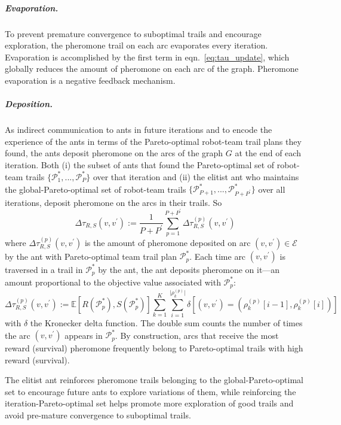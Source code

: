 \documentclass[11pt, oneside]{article}
\begin{document}
\subparagraph{Evaporation.} To prevent premature convergence to suboptimal trails and encourage exploration, the pheromone trail on each arc evaporates every iteration. 
Evaporation is accomplished by the first term in eqn.~\ref{eq:tau_update}, which globally reduces the amount of pheromone on each arc of the graph. 
Pheromone evaporation is a negative feedback mechanism. 

\subparagraph{Deposition.}
As indirect communication to ants in future iterations and to encode the experience of the ants in terms of the Pareto-optimal robot-team trail plans they found, the ants deposit pheromone on the arcs of the graph $G$ at the end of each iteration.
Both (i) the subset of ants that found the Pareto-optimal set of robot-team trails $\{\mathcal{P}_1^*, ..., \mathcal{P}_P^*\}$ over that iteration and (ii) the elitist ant who maintains the global-Pareto-optimal set of robot-team trails $\{\mathcal{P}_{P+1}^*, ..., \mathcal{P}_{P+P^\prime}^*\}$ over all iterations, deposit pheromone on the arcs in their trails. So
\begin{equation}
	\Delta \tau_{R,S}(v, v^\prime):=\frac{1}{P+P^\prime} \sum_{p=1}^{P+P^\prime} \Delta \tau_{R,S}^{(p)}(v, v^\prime)
\end{equation}
where $\Delta \tau_{R,S}^{(p)}(v, v^\prime)$ is the amount of pheromone deposited 
on arc $(v, v^\prime)\in \mathcal{E}$
by the ant with Pareto-optimal team trail plan $\mathcal{P}^*_p$.
Each time arc $(v, v^\prime)$ is traversed in a trail in $\mathcal{P}^*_p$ by the ant, 
the ant deposits pheromone on it---an amount proportional to the objective value associated with $\mathcal{P}^*_p$:
\begin{equation}
	\Delta \tau_{R,S}^{(p)}(v, v^\prime) := 
	\mathbb{E}[R(\mathcal{P}^*_p), S(\mathcal{P}^*_p)] 
	\sum_{k=1}^K 
	\sum_{i=1}^{\lvert \rho_k^{(p)}\rvert}
	\delta \left[ 
		(v, v^\prime)=(\rho_k^{(p)}[i-1], \rho_k^{(p)}[i])
	\right] 
\end{equation}
with $\delta$ the Kronecker delta function.
The double sum counts the number of times the arc $(v, v^\prime)$ appears in $\mathcal{P}^*_p$.
By construction, arcs that receive the most reward (survival) pheromone frequently belong to Pareto-optimal trails with high reward (survival).

The elitist ant reinforces pheromone trails belonging to the global-Pareto-optimal set to encourage future ants to explore variations of them, while reinforcing the iteration-Pareto-optimal set helps promote more exploration of good trails and avoid pre-mature convergence to suboptimal trails.
\end{document}
